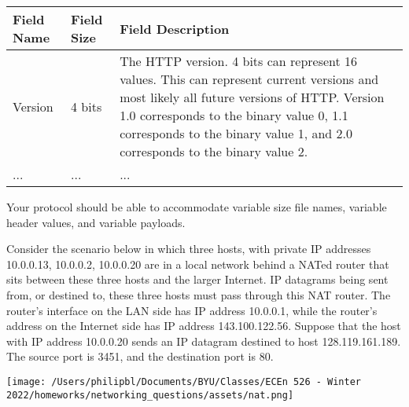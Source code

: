\documentclass[
  addpoints, answers]{exam}
\begin{document}
\begin{questions}
  \begin{table}[H]
  \centering
  \begin{tabular}{|l|l|p{10cm}|}
  \hline
  \textbf{Field Name} & \textbf{Field Size} & \textbf{Field Description} \\ \hline \hline
  Version             & 4 bits              & The HTTP version. 4 bits can represent 16 values. This can represent current versions and most likely all future versions of HTTP. Version 1.0 corresponds to the binary value 0, 1.1 corresponds to the binary value 1, and 2.0 corresponds to the binary value 2. \\ \hline
    ...               & ...                 & ...      \\ \hline
  \end{tabular}
  \end{table}

Your protocol should be able to accommodate variable size file names, variable header values, and variable payloads.


\begin{solution}
\end{solution}


\newpage


\question[5] Consider the scenario below in which three hosts, with private IP addresses 10.0.0.13, 10.0.0.2, 10.0.0.20 are in a local network behind a NATed router that sits between these three hosts and the larger Internet. IP datagrams being sent from, or destined to, these three hosts must pass through this NAT router. The router’s interface on the LAN side has IP address 10.0.0.1, while the router’s address on the Internet side has IP address 143.100.122.56. Suppose that the host with IP address 10.0.0.20 sends an IP datagram destined to host 128.119.161.189. The source port is 3451, and the destination port is 80.
\begin{center}
\texttt{[image: /Users/philipbl/Documents/BYU/Classes/ECEn 526 - Winter 2022/homeworks/networking\_questions/assets/nat.png]}
\end{center}

\end{questions}
\end{document}
